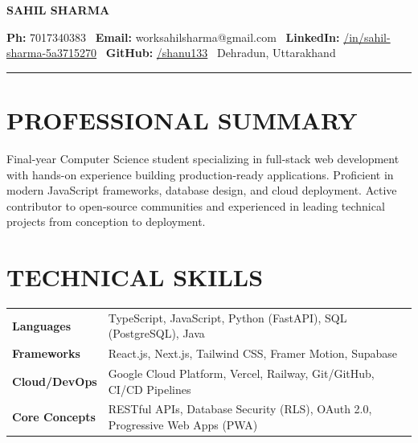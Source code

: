 \documentclass[11pt, a4paper]{article}
\newcommand{\divider}{\vspace{0.05cm}\hrule\vspace{0.05cm}}
\begin{document}
\begin{center}
    \fontsize{24pt}{28pt}\selectfont \textbf{SAHIL SHARMA} \\
\end{center}
\vspace{-0.1cm}
\begin{center}
    \footnotesize
    \textbf{Ph:} 7017340383 \textbar\ 
    \textbf{Email:} worksahilsharma@gmail.com \textbar\
    \textbf{LinkedIn:} \href{https://www.linkedin.com/in/sahil-sharma-5a3715270/}{/in/sahil-sharma-5a3715270} \textbar\
    \textbf{GitHub:} \href{https://github.com/shanu133}{/shanu133} \textbar\ 
    Dehradun, Uttarakhand
\end{center}
\divider
\section*{PROFESSIONAL SUMMARY}
Final-year Computer Science student specializing in full-stack web development with hands-on experience building production-ready applications. Proficient in modern JavaScript frameworks, database design, and cloud deployment. Active contributor to open-source communities and experienced in leading technical projects from conception to deployment.
\section*{TECHNICAL SKILLS}
\begin{tabular}{@{}p{3.3cm} p{12cm}@{}}
\textbf{Languages} & TypeScript, JavaScript, Python (FastAPI), SQL (PostgreSQL), Java \\[3pt]
\textbf{Frameworks} & React.js, Next.js, Tailwind CSS, Framer Motion, Supabase \\[3pt]
\textbf{Cloud/DevOps} & Google Cloud Platform, Vercel, Railway, Git/GitHub, CI/CD Pipelines \\[3pt]
\textbf{Core Concepts} & RESTful APIs, Database Security (RLS), OAuth 2.0, Progressive Web Apps (PWA) \\
\end{tabular}
\vspace{-0.5em}
\end{document}
